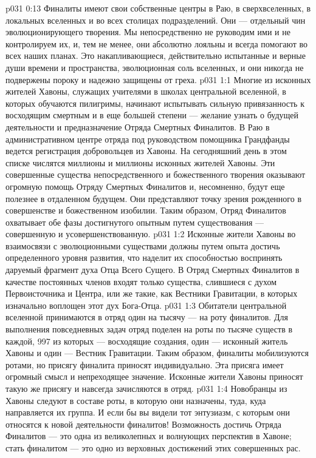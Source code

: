 \vs p031 0:13 Финалиты имеют свои собственные центры в Раю, в сверхвселенных, в локальных вселенных и во всех столицах подразделений. Они --- отдельный чин эволюционирующего творения. Мы непосредственно не руководим ими и не контролируем их, и, тем не менее, они абсолютно лояльны и всегда помогают во всех наших планах. Это накапливающиеся, действительно испытанные и верные души времени и пространства, эволюционная соль вселенных, и они никогда не подвержены пороку и надежно защищены от греха.
\vs p031 1:1 Многие из исконных жителей Хавоны, служащих учителями в школах центральной вселенной, в которых обучаются пилигримы, начинают испытывать сильную привязанность к восходящим смертным и в еще большей степени --- желание узнать о будущей деятельности и предназначение Отряда Смертных Финалитов. В Раю в административном центре отряда под руководством помощника Грандфанды ведется регистрация добровольцев из Хавоны. На сегодняшний день в этом списке числятся миллионы и миллионы исконных жителей Хавоны. Эти совершенные существа непосредственного и божественного творения оказывают огромную помощь Отряду Смертных Финалитов и, несомненно, будут еще полезнее в отдаленном будущем. Они представляют точку зрения рожденного в совершенстве и божественном изобилии. Таким образом, Отряд Финалитов охватывает обе фазы достигнутого опытным путем существования --- совершенную и усовершенствованную.
\vs p031 1:2 Исконные жители Хавоны во взаимосвязи с эволюционными существами должны путем опыта достичь определенного уровня развития, что наделит их способностью воспринять даруемый фрагмент духа Отца Всего Сущего. В Отряд Смертных Финалитов в качестве постоянных членов входят только существа, слившиеся с духом Первоисточника и Центра, или же такие, как Вестники Гравитации, в которых изначально воплощен этот дух Бога\hyp{}Отца.
\vs p031 1:3 Обитатели центральной вселенной принимаются в отряд один на тысячу --- на роту финалитов. Для выполнения повседневных задач отряд поделен на роты по тысяче существ в каждой, 997 из которых --- восходящие создания, один --- исконный житель Хавоны и один --- Вестник Гравитации. Таким образом, финалиты мобилизуются ротами, но присягу финалита приносят индивидуально. Эта присяга имеет огромный смысл и непреходящее значение. Исконные жители Хавоны приносят такую же присягу и навсегда зачисляются в отряд.
\vs p031 1:4 Новобранцы из Хавоны следуют в составе роты, в которую они назначены, туда, куда направляется их группа. И если бы вы видели тот энтузиазм, с которым они относятся к новой деятельности финалитов! Возможность достичь Отряда Финалитов --- это одна из великолепных и волнующих перспектив в Хавоне; стать финалитом --- это одно из верховных достижений этих совершенных рас.
